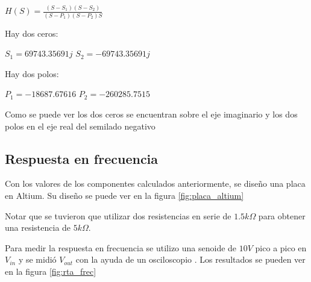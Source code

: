 \documentclass[12pt,a4paper]{article}
\begin{document}
\begin{center}
    $H(S) = \frac{(S-S_{1})(S-S_{2})}{(S-P_{1})(S-P_{2})S}$  \\
\end{center}

Hay dos ceros:
\begin{center}
    $S_{1}=69743.35691j $
    $S_{2}=-69743.35691j $
    \end{center}

Hay dos polos:

\begin{center}
    $P_{1}=-18687.67616$
    $P_{2}=-260285.7515$
\end{center}

Como se puede ver los dos ceros se encuentran sobre el eje imaginario y los dos polos en el eje real del
semilado negativo


\begin{center}
    \end{center}

\subsection{Respuesta en frecuencia}
Con los valores de los componentes calculados anteriormente, se diseño una placa en Altium. Su diseño se 
puede ver en la figura \ref{fig:placa_altium}


Notar que se tuvieron que utilizar dos resistencias en serie de $1.5k\Omega$ para obtener una
resistencia de $5k\Omega$. 

Para medir la respuesta en frecuencia se utilizo una senoide de $10V$ pico a pico en $V_{in}$ y se midió $V_{out}$
con la ayuda de un osciloscopio . Los resultados se pueden ver en la figura \ref{fig:rta_frec}
\end{document}
